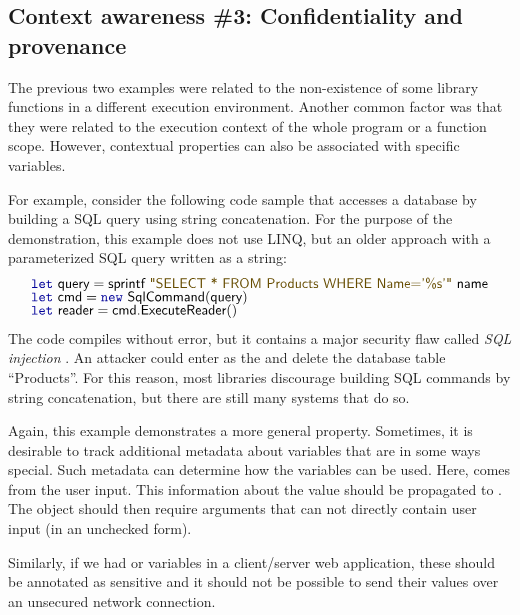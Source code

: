
\subsection{Context awareness \#3: Confidentiality and provenance}

The previous two examples were related to the non-existence of some library functions in a different
execution environment. Another common factor was that they were related to the execution context of
the whole program or a function scope. However, contextual properties can also be associated with
specific variables.

For example, consider the following code sample that accesses a database by building a SQL query
using string concatenation. For the purpose of the demonstration, this example does not use LINQ,
but an older approach with a parameterized SQL query written as a string:
%
\begin{equation*}
\begin{array}{l}
\kvd{let}~\ident{query} = \ident{sprintf}~\str{SELECT * FROM Products WHERE Name='\%s'}~\ident{name}\\[-0.25em]
\kvd{let}~\ident{cmd} = \kvd{new}~\ident{SqlCommand}(\ident{query})\\[-0.25em]
\kvd{let}~\ident{reader} = \ident{cmd.ExecuteReader}()
\end{array}
\end{equation*}
%
The code compiles without error, but it contains a major security flaw called \emph{SQL injection}
\cite{app-sql-injection}. An attacker could enter  as the
 and delete the database table ``Products''. For this reason, most libraries discourage
building SQL commands by string concatenation, but there are still many systems that do so.

Again, this example demonstrates a more general property. Sometimes, it is desirable to track additional
metadata about variables that are in some ways special. Such metadata can determine how the variables
can be used. Here,  comes from the user input. This information about the value should
be propagated to . The  object should then require arguments that can
not directly contain user input (in an unchecked form).

Similarly, if we had  or  variables in a client/server web application,
these should be annotated as sensitive and it should not be possible to send their values over an
unsecured network connection.

